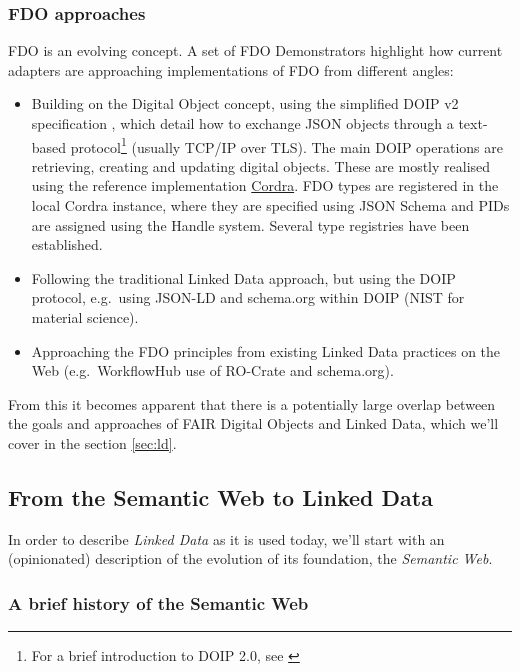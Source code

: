 \documentclass[fleqn,10pt,lineno]{wlpeerj}
\providecommand{\tightlist}{%
  \setlength{\itemsep}{0pt}\setlength{\parskip}{0pt}}
\begin{document}
\hypertarget{fdo-approaches}{%
\subsubsection*{FDO approaches}\label{fdo-approaches}}

FDO is an evolving concept. A set of FDO Demonstrators \cite{jRWurmQc} highlight how current adapters are approaching implementations of FDO from different angles:

\begin{itemize}
\tightlist
\item
  Building on the Digital Object concept, using the simplified DOIP v2 specification \cite{13TcbsZF6}, which detail how to exchange JSON objects through a text-based protocol\footnote{For a brief introduction to DOIP 2.0, see \cite{xuQKRRx5}} (usually TCP/IP over TLS). The main DOIP operations are retrieving, creating and updating digital objects. These are mostly realised using the reference implementation \href{https://cordra.org/}{Cordra}. FDO types are registered in the local Cordra instance, where they are specified using JSON Schema \cite{15EZ2D0Rm} and PIDs are assigned using the Handle system. Several type registries have been established.
\item
  Following the traditional Linked Data approach, but using the DOIP protocol, e.g.~using JSON-LD and schema.org within DOIP (NIST for material science).
\item
  Approaching the FDO principles from existing Linked Data practices on the Web (e.g.~WorkflowHub use of RO-Crate and schema.org).
\end{itemize}

From this it becomes apparent that there is a potentially large overlap between the goals and approaches of FAIR Digital Objects and Linked Data, which we'll cover in the section \ref{sec:ld}.

\hypertarget{sec:ld}{%
\subsection*{From the Semantic Web to Linked Data}\label{sec:ld}}

In order to describe \emph{Linked Data} as it is used today, we'll start with an (opinionated) description of the evolution of its foundation, the \emph{Semantic Web}.

\hypertarget{sec:semweb}{%
\subsubsection*{A brief history of the Semantic Web}\label{sec:semweb}}
\end{document}
